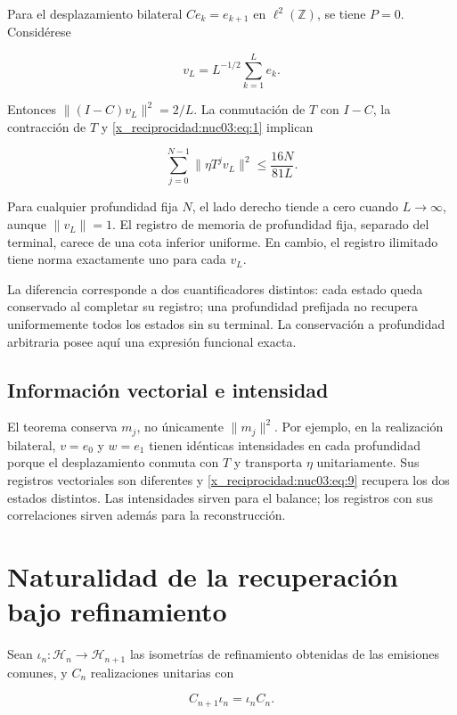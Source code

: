 Para el desplazamiento bilateral \(Ce_k=e_{k+1}\) en \(\ell^2(\mathbb Z)\), se tiene \(P=0\). Considérese

\[
v_L=L^{-1/2}\sum_{k=1}^{L}e_k.
\]

Entonces \(\|(I-C)v_L\|^2=2/L\). La conmutación de \(T\) con \(I-C\), la contracción de \(T\) y \eqref{x_reciprocidad:nuc03:eq:1} implican

\begin{equation}
\sum_{j=0}^{N-1}\|\eta T^jv_L\|^2
\leq\frac{16N}{81L}.
\label{x_reciprocidad:nuc03:eq:11}
\end{equation}

Para cualquier profundidad fija \(N\), el lado derecho tiende a cero cuando \(L\to\infty\), aunque \(\|v_L\|=1\). El registro de memoria de profundidad fija, separado del terminal, carece de una cota inferior uniforme. En cambio, el registro ilimitado tiene norma exactamente uno para cada \(v_L\).

La diferencia corresponde a dos cuantificadores distintos: cada estado queda conservado al completar su registro; una profundidad prefijada no recupera uniformemente todos los estados sin su terminal. La conservación a profundidad arbitraria posee aquí una expresión funcional exacta.

\subsection{Información vectorial e intensidad}

El teorema conserva \(m_j\), no únicamente \(\|m_j\|^2\). Por ejemplo, en la realización bilateral, \(v=e_0\) y \(w=e_1\) tienen idénticas intensidades en cada profundidad porque el desplazamiento conmuta con \(T\) y transporta \(\eta\) unitariamente. Sus registros vectoriales son diferentes y \eqref{x_reciprocidad:nuc03:eq:9} recupera los dos estados distintos. Las intensidades sirven para el balance; los registros con sus correlaciones sirven además para la reconstrucción.

\section{Naturalidad de la recuperación bajo refinamiento}

Sean \(\iota_n:\mathcal H_n\to\mathcal H_{n+1}\) las isometrías de refinamiento obtenidas de las emisiones comunes, y \(C_n\) realizaciones unitarias con

\begin{equation}
C_{n+1}\iota_n=\iota_nC_n.
\label{x_reciprocidad:nuc03:eq:12}
\end{equation}

